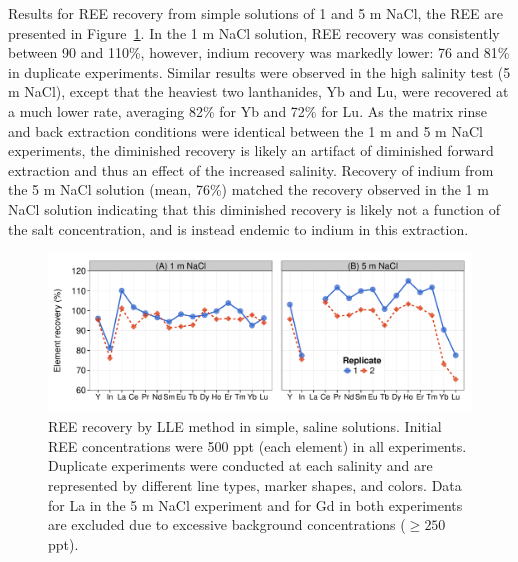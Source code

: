Results for REE recovery from simple solutions of 1 and 5 m NaCl, the REE are presented in Figure~\ref{fig:NaCl-only}.
In the 1 m NaCl solution, REE recovery was consistently between 90 and 110\%, however, indium recovery was markedly lower: 76 and 81\% in duplicate experiments.
Similar results were observed in the high salinity test (5 m NaCl), except that the heaviest two lanthanides, Yb and Lu, were recovered at a much lower rate, averaging 82\% for Yb and 72\% for Lu.
As the matrix rinse and back extraction conditions were identical between the 1 m and 5 m NaCl experiments, the diminished recovery is likely an artifact of diminished forward extraction and thus an effect of the increased salinity.
Recovery of indium from the 5 m NaCl solution (mean, 76\%) matched the recovery observed in the 1 m NaCl solution indicating that this diminished recovery is likely not a function of the salt concentration, and is instead endemic to indium in this extraction.

\begin{figure}[htbp]
\begin{center}
\includegraphics[width=\textwidth]{Ch4_figures/NaCl-only-LLE.pdf}
\caption{REE recovery by LLE method in simple, saline solutions.
Initial REE concentrations were 500 ppt (each element) in all experiments.
Duplicate experiments were conducted at each salinity and are represented by different line types, marker shapes, and colors.
Data for La in the 5 m NaCl experiment and for Gd in both experiments are excluded due to excessive background concentrations ($\geq250$ ppt).}
\label{fig:NaCl-only}
\end{center}
\end{figure}

